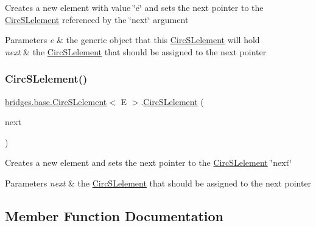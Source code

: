 Creates a new element with value \char`\"{}e\char`\"{} and sets the next pointer to the \hyperlink{classbridges_1_1base_1_1_circ_s_lelement}{Circ\+S\+Lelement} referenced by the \char`\"{}next\char`\"{} argument


\begin{DoxyParams}{Parameters}
{\em e} & the generic object that this \hyperlink{classbridges_1_1base_1_1_circ_s_lelement}{Circ\+S\+Lelement} will hold \\
\hline
{\em next} & the \hyperlink{classbridges_1_1base_1_1_circ_s_lelement}{Circ\+S\+Lelement} that should be assigned to the next pointer \\
\hline
\end{DoxyParams}
\hypertarget{classbridges_1_1base_1_1_circ_s_lelement_ab9e5b98e8d917760b9651a52785358b9}{}\label{classbridges_1_1base_1_1_circ_s_lelement_ab9e5b98e8d917760b9651a52785358b9} 
\subsubsection{\texorpdfstring{Circ\+S\+Lelement()}{CircSLelement()}\hspace{0.1cm}{\footnotesize\ttfamily [4/4]}}
{\footnotesize\ttfamily \hyperlink{classbridges_1_1base_1_1_circ_s_lelement}{bridges.\+base.\+Circ\+S\+Lelement}$<$ E $>$.\hyperlink{classbridges_1_1base_1_1_circ_s_lelement}{Circ\+S\+Lelement} (\begin{DoxyParamCaption}\item[{\hyperlink{classbridges_1_1base_1_1_circ_s_lelement}{Circ\+S\+Lelement}$<$ E $>$}]{next }\end{DoxyParamCaption})}

Creates a new element and sets the next pointer to the \hyperlink{classbridges_1_1base_1_1_circ_s_lelement}{Circ\+S\+Lelement} \char`\"{}next\char`\"{} 
\begin{DoxyParams}{Parameters}
{\em next} & the \hyperlink{classbridges_1_1base_1_1_circ_s_lelement}{Circ\+S\+Lelement} that should be assigned to the next pointer \\
\hline
\end{DoxyParams}


\subsection{Member Function Documentation}
\hypertarget{classbridges_1_1base_1_1_circ_s_lelement_ad56acddc52e8e0b6869a6f24f1e0a90e}{}\label{classbridges_1_1base_1_1_circ_s_lelement_ad56acddc52e8e0b6869a6f24f1e0a90e} 
